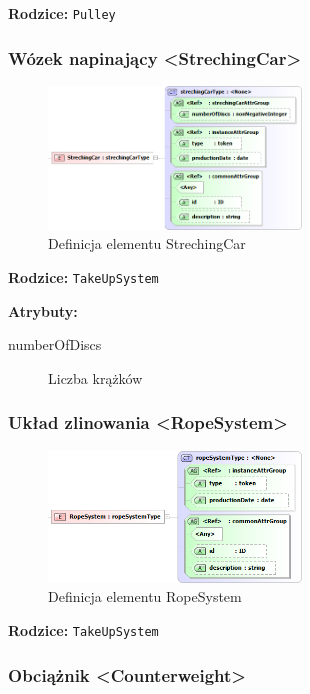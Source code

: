 \documentclass[12pt,a4paper]{article}
\begin{document}
\noindent\textbf{Rodzice:} \texttt{Pulley}

\subsubsection{Wózek napinający <StrechingCar>}

\begin{figure}[H]
  \centering
  \includegraphics[width=0.6\textwidth]{png/liquid/StrechingCar}
  \caption{Definicja elementu StrechingCar}
  \label{fig:strechingCar-xsd}
\end{figure}

\noindent\textbf{Rodzice:} \texttt{TakeUpSystem}

\noindent\textbf{Atrybuty:}
\begin{description}
\item[numberOfDiscs] Liczba krążków
\end{description}


\subsubsection{Układ zlinowania <RopeSystem>}

\begin{figure}[H]
  \centering
  \includegraphics[width=0.6\textwidth]{png/liquid/RopeSystem}
  \caption{Definicja elementu RopeSystem}
  \label{fig:ropeSystem-xsd}
\end{figure}

\noindent\textbf{Rodzice:} \texttt{TakeUpSystem}


\subsubsection{Obciążnik <Counterweight>}
\end{document}
